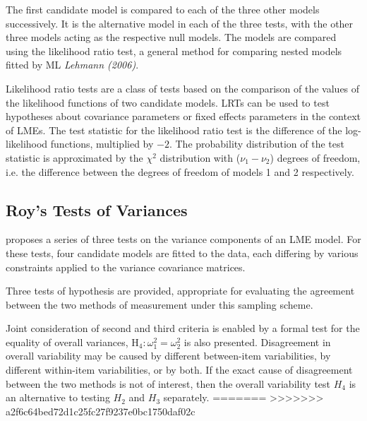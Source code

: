 \documentclass[12pt, a4paper]{report}
\theoremstyle{plain}
\theoremstyle{definition}
\theoremstyle{remark}
\begin{document}
	The first candidate model is compared to each of the three other models successively. It is the alternative model in each of the three tests, with the other three models acting as the respective null models. The models are compared using the likelihood ratio test, a general method for comparing nested models fitted by ML \citep{Lehmann2006} \textit{Lehmann (2006)}.
	
	Likelihood ratio tests are a class of tests based on the comparison of the values of the likelihood functions of two candidate models. LRTs can be used to test hypotheses about covariance parameters or fixed effects parameters in the context of LMEs. The test statistic for the likelihood ratio test is the difference of the log-likelihood functions, multiplied by $-2$.
	The probability distribution of the test statistic is approximated by the $\chi^2$ distribution with ($\nu_{1} - \nu_{2}$) degrees of freedom, i.e. the difference between the degrees of freedom of models 1 and 2 respectively. 
	
	
	
	\subsection{Roy's Tests of Variances}
	
	
	
	
	\citet{ARoy2009} proposes a series of three tests on the variance components of an LME model. For these tests, four candidate models are fitted to the data, each differing by various constraints applied to the variance covariance matrices. 
	
	
	
	
	Three tests of hypothesis are provided, appropriate for evaluating the agreement between the two methods of measurement under this sampling scheme. 
	
Joint consideration of second and third criteria is enabled by a formal test for the equality of overall variances, $\operatorname{H_4} : \omega^2_1 = \omega^2_2$ is also presented. Disagreement in overall variability may be caused by different between-item variabilities, by different within-item variabilities, or by both.  If the exact cause of disagreement between the two methods is not of interest, then the overall variability test $H_4$ is an alternative to testing $H_2$ and $H_3$ separately.
=======
>>>>>>> a2f6c64bed72d1c25fc27f9237e0bc1750daf02c
\end{document}

